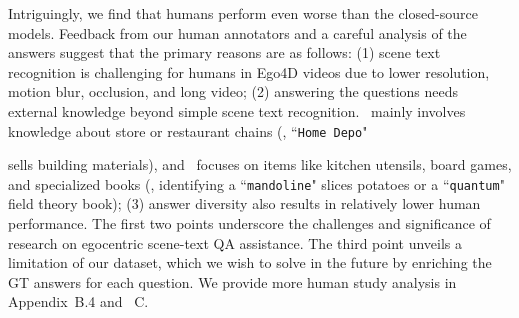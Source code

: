 Intriguingly, we find that humans perform even worse than the closed-source models. Feedback from our human annotators and a careful analysis of the answers suggest that the primary reasons are as follows: (1) scene text recognition is challenging for humans in Ego4D videos due to lower resolution, motion blur, occlusion, and long video; (2) answering the questions needs external knowledge beyond simple scene text recognition. \datasetout~mainly involves knowledge about store or restaurant chains (\eg, ``\texttt{Home Depo}" {sells building materials), and \datasetin~focuses on items like kitchen utensils, board games, and specialized books (\eg, identifying {a} ``\texttt{mandoline}" {slices potatoes} or {a} ``\texttt{quantum}" {{field theory book})};
(3) answer diversity also results in relatively lower human performance. 
The first two points underscore the challenges and significance of research on egocentric scene-text QA assistance. The third point unveils a limitation of our dataset, which we wish to solve in the future by enriching the GT answers for each question. We provide more human study analysis in Appendix~{\color{red}B.4} and ~{\color{red}C}.


}
